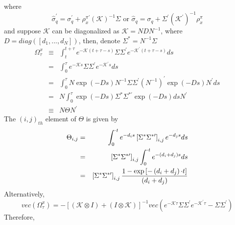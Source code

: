 \documentclass{article}
\begin{document}
where%
\begin{equation*}
\widehat{\sigma }_{q}^{\prime }=\sigma _{q}^{\prime }+\rho _{x}^{\pi \prime
}\left( \mathcal{K}\right) ^{-1}\Sigma \text{ or }\widehat{\sigma }%
_{q}=\sigma _{q}+\Sigma ^{\prime }\left( \mathcal{K}^{\prime }\right)
^{-1}\rho _{x}^{\pi }
\end{equation*}%
and suppose $\mathcal{K}$ can be diagonalized as $\mathcal{K=}NDN^{-1}$,
where $D=diag\left( \left[ d_{1},...,d_{N}\right] \right) $, then, denote $%
\Sigma ^{\ast }=N^{-1}\Sigma $%
\begin{eqnarray*}
\Omega _{\tau }^{x} &\equiv &\int_{t}^{t+\tau }e^{-\mathcal{K}\left( t+\tau
-s\right) }\Sigma \Sigma ^{\prime }e^{-\mathcal{K}^{\prime }\left( t+\tau
-s\right) }ds \\
&=&\int_{0}^{\tau }e^{-\mathcal{K}s}\Sigma \Sigma ^{\prime }e^{-\mathcal{K}%
^{\prime }s}ds \\
&=&\int_{0}^{\tau }N\exp \left( -Ds\right) N^{-1}\Sigma \Sigma ^{\prime
}\left( N^{-1}\right) ^{\prime }\exp \left( -Ds\right) N^{\prime }ds \\
&=&N\int_{0}^{\tau }\exp \left( -Ds\right) \Sigma ^{\ast }\Sigma ^{\ast
\prime }\exp \left( -Ds\right) dsN^{\prime } \\
&\equiv &N\Theta N^{\prime }
\end{eqnarray*}%
The $\left( i,j\right) _{th}$ element of $\Theta $ is given by%
\begin{eqnarray*}
\Theta _{i,j} &=&\int_{0}^{\mathcal{\Delta }t}e^{-d_{i}s}\left[ \Sigma
^{\ast }\Sigma ^{\ast \prime }\right] _{i,j}e^{-d_{j}s}ds \\
&=&\left[ \Sigma ^{\ast }\Sigma ^{\ast \prime }\right] _{i,j}\int_{0}^{%
\mathcal{\Delta }t}e^{-\left( d_{i}+d_{j}\right) s}ds \\
&=&\left[ \Sigma ^{\ast }\Sigma ^{\ast \prime }\right] _{i,j}\frac{1-\exp %
\left[ -\left( d_{i}+d_{j}\right) \mathcal{\Delta }t\right] }{\left(
d_{i}+d_{j}\right) }
\end{eqnarray*}%
Alternatively, 
\begin{equation*}
vec\left( \Omega _{\tau }^{x}\right) =-\left[ \left( \mathcal{K}\otimes
I\right) +\left( I\otimes \mathcal{K}\right) \right] ^{-1}vec\left( e^{-%
\mathcal{K}\tau }\Sigma \Sigma ^{\prime }e^{-\mathcal{K}^{\prime }\tau
}-\Sigma \Sigma ^{\prime }\right) 
\end{equation*}%
Therefore,%
\end{document}
